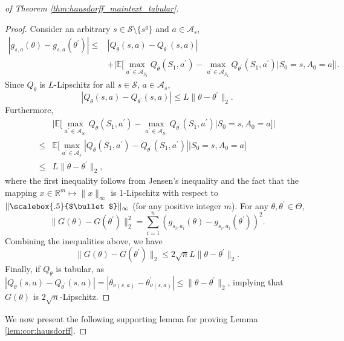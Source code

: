 \documentclass{amsart}
\renewcommand{\cdot}[1][.5]{%
  \mathbin{\vcenter{\hbox{\scalebox{#1}{$\bullet$}}}}%
}
\begin{document}
\begin{proof}[of Theorem \ref{thm:hausdorff_maintext_tabular}]
\begin{proof}
Consider an arbitrary $s \in \mathcal{S}\setminus\{s^g\}$ and $a \in \mathcal{A}_s$,
    \begin{align*}
    |g_{s,a}(\theta)-g_{s,a}(\theta^\prime)| \leq &|Q_\theta(s,a)-Q_{\theta^\prime}(s,a)| \\
    &+ \Bigg|\mathbb{E}\Big[\max_{a^\prime \in \mathcal{A}_{S_1}} Q_\theta(S_1,a^\prime)-\max_{a^\prime \in \mathcal{A}_{S_1}} Q_{\theta^\prime}(S_1,a^\prime) \Big|S_0=s,A_0=a \Big]\Bigg|.
    \end{align*}
Since $Q_\theta$ is $L$-Lipschitz for all $s\in \mathcal{S}$, $a \in \mathcal{A}_s$, 
$$|Q_\theta(s,a)-Q_{\theta^\prime}(s,a)| \leq L \lVert\theta-\theta^\prime\rVert_2.$$
Furthermore,
\begin{align*}
    &\Bigg|\mathbb{E}\Big[\max_{a^\prime \in \mathcal{A}_{S_1}} Q_\theta(S_1,a^\prime)-\max_{a^\prime \in \mathcal{A}_{S_1}} Q_{\theta^\prime}(S_1,a^\prime) \Big|S_0=s,A_0=a \Big]\Bigg|\\
    \leq& \mathbb{E} \Big[ \max_{a^\prime \in \mathcal{A}_s} | Q_\theta(S_1,a^\prime)-Q_{\theta^\prime}(S_1,a^\prime) | \Big| S_0=s,A_0=a\Big] \\
    \leq & L \lVert\theta-\theta^\prime\rVert_2,
\end{align*}
where the first inequality follows from Jensen's inequality and the fact that the mapping  $x \in \mathbb{R}^m \mapsto \lVert x\rVert_\infty$ is 1-Lipschitz with respect to $\lVert\cdot\rVert_\infty$ (for any positive integer $m$). For any $\theta,\theta^\prime \in \Theta$,
    $$\lVert G(\theta)-G(\theta^\prime)\rVert_2^2=\sum_{i=1}^n (g_{s_i,a_i}(\theta)-g_{s_i,a_i}(\theta^\prime))^2.$$
Combining the inequalities above, we have
$$\lVert G(\theta)-G(\theta^\prime)\rVert_2 \leq 2\sqrt{n}L \lVert\theta-\theta^\prime\rVert_2.$$
Finally, if $Q_\theta$ is tabular, as $|Q_\theta(s,a)-Q_{\theta^\prime}(s,a)|=|\theta_{\nu(s,a)}-\theta^\prime_{\nu(s,a)}|\leq \lVert\theta-\theta^\prime\rVert_2$, implying that $G(\theta)$ is $2\sqrt{n}$-Lipschitz.
\end{proof}

 We now present the following supporting lemma for proving Lemma \ref{lem:cor:hausdorff}.


\end{proof}
\end{document}
